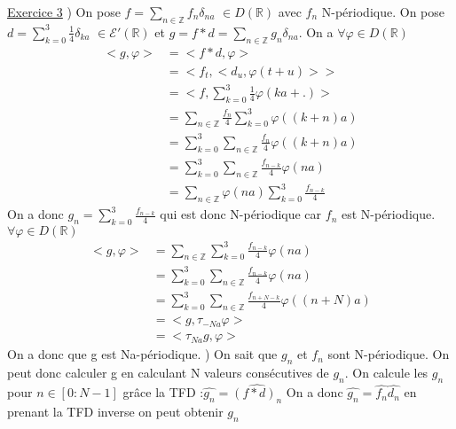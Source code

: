 \documentclass[a4paper,11pt]{article}
\begin{document}
\bigbreak
\underline{Exercice 3}
) On pose $\displaystyle f= \sum_{n \in \mathbb{Z}} f_n \delta_{na} \,\, \in D(\mathbb{R})$ avec $f_n$ N-périodique.
On pose $\displaystyle d = \sum_{k=0}^{3} \frac{1}{4}\delta_{ka} \,\, \in \mathcal{E}'(\mathbb{R})$ et
$\displaystyle g = f \ast d = \sum_{n \in \mathbb{Z}} g_n \delta_{na}$.
\newline
On a $\displaystyle \forall \varphi \in D(\mathbb{R})$
\begin{equation}
    \begin{aligned}
        <g,\varphi> &= <f\ast d, \varphi> \\
                    &= <f_{t},<d_{u},\varphi(t+u)>>\\
                    &= <f, \displaystyle{\sum_{k=0}^3 \frac{1}{4} \varphi(ka+.)}>\\
                    &= \displaystyle{\sum_{n \in \mathbb{Z}} \frac{f_n}{4} \sum_{k=0}^{3} \varphi((k+n)a)}\\
                    &=\displaystyle{\sum_{k=0}^{3} \sum_{n \in \mathbb{Z}} \frac{f_n}{4} \varphi((k+n)a)}\\
                    &=\displaystyle{\sum_{k=0}^{3} \sum_{n \in \mathbb{Z}} \frac{f_{n-k}}{4} \varphi(na)}\\
                    &=\displaystyle{\sum_{n \in \mathbb{Z}} \varphi(na) \sum_{k=0}^{3} \frac{f_{n-k}}{4}}
    \end{aligned}
\end{equation}
On a donc $\displaystyle g_n = \sum_{k=0}^{3} \frac{f_{n-k}}{4}$ qui est donc N-périodique car $f_n$ est N-périodique.
\newline
$\forall \varphi \in D(\mathbb{R})$
\begin{equation}
    \begin{aligned}
        <g,\varphi> &= \displaystyle{\sum_{n \in \mathbb{Z}} \sum_{k=0}^{3} \frac{f_{n-k}}{4} \varphi(na)}\\
                    &= \displaystyle{\sum_{k=0}^{3} \sum_{n \in \mathbb{Z}} \frac{f_{n-k}}{4} \varphi(na)}\\
                    &= \displaystyle{\sum_{k=0}^{3} \sum_{n \in \mathbb{Z}} \frac{f_{n+N-k}}{4} \varphi((n+N)a)}\\
                    &= <g, \tau_{-Na}\varphi>\\
                    &= <\tau_{Na}g,\varphi>
    \end{aligned}
\end{equation}
On a donc que g est Na-périodique.
) On sait que $g_n$ et $f_n$ sont N-périodique. On peut donc calculer g en calculant N valeurs consécutives de $g_n$.
On calcule les $g_n$ pour $ n \in \left[ 0:N-1 \right]$ grâce  la TFD :$\widehat{g_n} = \widehat{(f * d)_n}$
On a donc $\widehat{g_n} = \widehat{f_n}\widehat{d_n}$ en prenant la TFD inverse on peut obtenir $g_n$
\end{document}

